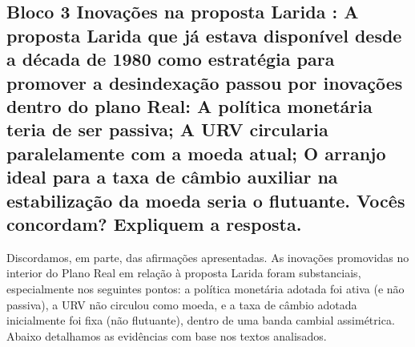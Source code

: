\documentclass[a4paper,12pt]{article}[abntex2]
\begin{document}
\subsection{\textbf{Bloco 3 Inovações na proposta Larida : A proposta Larida que já estava disponível desde a década de 1980 como estratégia para promover a desindexação passou por inovações dentro do plano Real: A política monetária teria de ser passiva; A URV circularia paralelamente com a moeda atual; O arranjo ideal para a taxa de câmbio auxiliar na estabilização da moeda seria o flutuante. Vocês concordam? Expliquem a resposta.}}

Discordamos, em parte, das afirmações apresentadas. As inovações promovidas no interior do Plano Real em relação à proposta Larida foram substanciais, especialmente nos seguintes pontos: a política monetária adotada foi ativa (e não passiva), a URV não circulou como moeda, e a taxa de câmbio adotada inicialmente foi fixa (não flutuante), dentro de uma banda cambial assimétrica. Abaixo detalhamos as evidências com base nos textos analisados.
\end{document}
